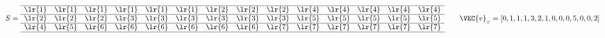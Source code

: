 \[S = 
    \begin{array}[c]{*{14}c}\cline{1-14}
    \lr{1}&\lr{1}&\lr{1}&\lr{1}&\lr{1}&\lr{1}&\lr{2}&\lr{2}&\lr{2}&\lr{4}&\lr{4}&\lr{4}&\lr{4}&\lr{4}\\\cline{1-14}
    \lr{2}&\lr{2}&\lr{2}&\lr{3}&\lr{3}&\lr{3}&\lr{3}&\lr{3}&\lr{3}&\lr{5}&\lr{5}&\lr{5}&\lr{5}&\lr{5}\\\cline{1-14}
    \lr{4}&\lr{5}&\lr{6}&\lr{6}&\lr{6}&\lr{6}&\lr{6}&\lr{6}&\lr{7}&\lr{7}&\lr{7}&\lr{7}&\lr{7}&\lr{7}\\\cline{1-14}
    \end{array}
    \hspace{20pt}
    \VEC{v}_{_{S}} = [0, 1, 1, 1, 3, 2, 1, 0, 0, 0, 5, 0, 0, 2]
\]
